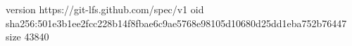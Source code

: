 version https://git-lfs.github.com/spec/v1
oid sha256:501e3b1ee2fcc228b14f8fbae6c9ae5768e98105d10680d25dd1eba752b76447
size 43840
